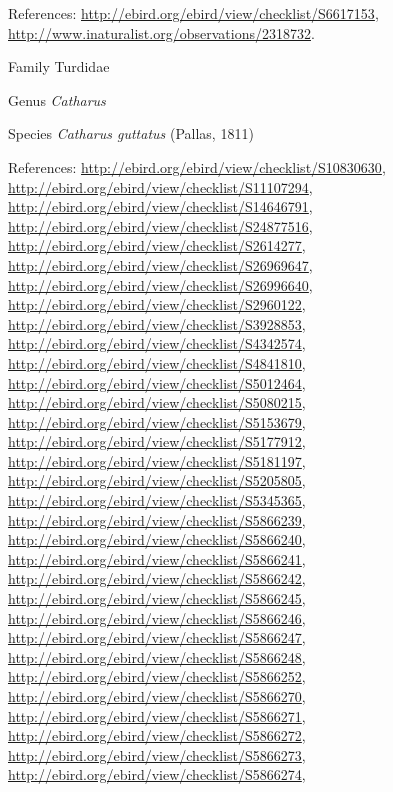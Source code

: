 \documentclass[9pt, article]{memoir}
\begin{document}
\begin{multicols}{2}
\vspace{6pt}References: 
\url{http://ebird.org/ebird/view/checklist/S6617153}, 
\url{http://www.inaturalist.org/observations/2318732}.

\vspace{6pt}\noindent\hspace{24pt}Family Turdidae


\vspace{6pt}\noindent\hspace{30pt}Genus \textit{Catharus}


\vspace{6pt}\noindent\hspace{36pt}Species \textit{Catharus guttatus} (Pallas, 1811)


\vspace{6pt}References: 
\url{http://ebird.org/ebird/view/checklist/S10830630}, 
\url{http://ebird.org/ebird/view/checklist/S11107294}, 
\url{http://ebird.org/ebird/view/checklist/S14646791}, 
\url{http://ebird.org/ebird/view/checklist/S24877516}, 
\url{http://ebird.org/ebird/view/checklist/S2614277}, 
\url{http://ebird.org/ebird/view/checklist/S26969647}, 
\url{http://ebird.org/ebird/view/checklist/S26996640}, 
\url{http://ebird.org/ebird/view/checklist/S2960122}, 
\url{http://ebird.org/ebird/view/checklist/S3928853}, 
\url{http://ebird.org/ebird/view/checklist/S4342574}, 
\url{http://ebird.org/ebird/view/checklist/S4841810}, 
\url{http://ebird.org/ebird/view/checklist/S5012464}, 
\url{http://ebird.org/ebird/view/checklist/S5080215}, 
\url{http://ebird.org/ebird/view/checklist/S5153679}, 
\url{http://ebird.org/ebird/view/checklist/S5177912}, 
\url{http://ebird.org/ebird/view/checklist/S5181197}, 
\url{http://ebird.org/ebird/view/checklist/S5205805}, 
\url{http://ebird.org/ebird/view/checklist/S5345365}, 
\url{http://ebird.org/ebird/view/checklist/S5866239}, 
\url{http://ebird.org/ebird/view/checklist/S5866240}, 
\url{http://ebird.org/ebird/view/checklist/S5866241}, 
\url{http://ebird.org/ebird/view/checklist/S5866242}, 
\url{http://ebird.org/ebird/view/checklist/S5866245}, 
\url{http://ebird.org/ebird/view/checklist/S5866246}, 
\url{http://ebird.org/ebird/view/checklist/S5866247}, 
\url{http://ebird.org/ebird/view/checklist/S5866248}, 
\url{http://ebird.org/ebird/view/checklist/S5866252}, 
\url{http://ebird.org/ebird/view/checklist/S5866270}, 
\url{http://ebird.org/ebird/view/checklist/S5866271}, 
\url{http://ebird.org/ebird/view/checklist/S5866272}, 
\url{http://ebird.org/ebird/view/checklist/S5866273}, 
\url{http://ebird.org/ebird/view/checklist/S5866274}, 

\end{multicols}
\end{document}
